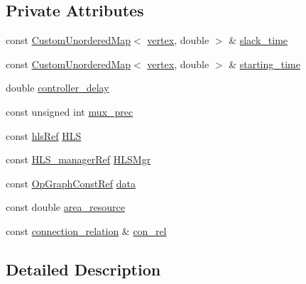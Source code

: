 \subsection*{Private Attributes}
\begin{DoxyCompactItemize}
\item 
const \hyperlink{custom__map_8hpp_ad1ed68f2ff093683ab1a33522b144adc}{Custom\+Unordered\+Map}$<$ \hyperlink{graph_8hpp_abefdcf0544e601805af44eca032cca14}{vertex}, double $>$ \& \hyperlink{structslack__based__filtering_a3f1700043f1f8aa0f7024c5818f790b5}{slack\+\_\+time}
\item 
const \hyperlink{custom__map_8hpp_ad1ed68f2ff093683ab1a33522b144adc}{Custom\+Unordered\+Map}$<$ \hyperlink{graph_8hpp_abefdcf0544e601805af44eca032cca14}{vertex}, double $>$ \& \hyperlink{structslack__based__filtering_a6ca7c17e1dd2e4adf70f1f8b919f3dbb}{starting\+\_\+time}
\item 
double \hyperlink{structslack__based__filtering_a046f2052c4d9bd811baf6a3cc7da75dd}{controller\+\_\+delay}
\item 
const unsigned int \hyperlink{structslack__based__filtering_a92899a636280e68c9bc54a420acabcfe}{mux\+\_\+prec}
\item 
const \hyperlink{hls_8hpp_a75d0c73923d0ddfa28c4843a802c73a7}{hls\+Ref} \hyperlink{structslack__based__filtering_a92eabd1759031db4dbd9779f37d2d32c}{H\+LS}
\item 
const \hyperlink{hls__manager_8hpp_acd3842b8589fe52c08fc0b2fcc813bfe}{H\+L\+S\+\_\+manager\+Ref} \hyperlink{structslack__based__filtering_ac359b1f6447cbc87373325f09fbaa553}{H\+L\+S\+Mgr}
\item 
const \hyperlink{op__graph_8hpp_a9a0b240622c47584bee6951a6f5de746}{Op\+Graph\+Const\+Ref} \hyperlink{structslack__based__filtering_ae3b2e6a3f1f6f3be05d13dc8e77b10aa}{data}
\item 
const double \hyperlink{structslack__based__filtering_a7cf239031e69888a3af12ef04b007d62}{area\+\_\+resource}
\item 
const \hyperlink{cdfc__module__binding_8hpp_add937cbd74df34342adc0bb9231809a8}{connection\+\_\+relation} \& \hyperlink{structslack__based__filtering_a09383884076608ead3da546fa026d633}{con\+\_\+rel}
\end{DoxyCompactItemize}


\subsection{Detailed Description}


